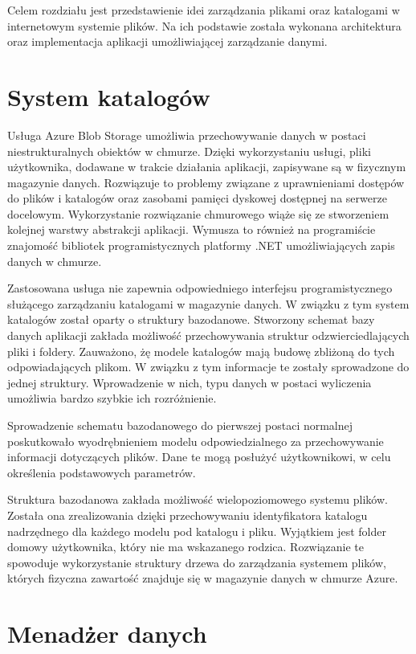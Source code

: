Celem rozdziału jest przedstawienie idei zarządzania plikami oraz katalogami w internetowym systemie plików. Na ich podstawie została wykonana architektura oraz implementacja aplikacji umożliwiającej zarządzanie danymi. 
\section{System katalogów}
Usługa Azure Blob Storage umożliwia przechowywanie danych w postaci niestrukturalnych obiektów w chmurze. Dzięki wykorzystaniu usługi, pliki użytkownika, dodawane w trakcie działania aplikacji, zapisywane są w fizycznym magazynie danych. Rozwiązuje to problemy związane z uprawnieniami dostępów do plików i katalogów oraz zasobami pamięci dyskowej dostępnej na serwerze docelowym. Wykorzystanie rozwiązanie chmurowego wiąże się ze stworzeniem kolejnej warstwy abstrakcji aplikacji. Wymusza to również na programiście znajomość bibliotek programistycznych platformy .NET umożliwiających zapis danych w chmurze. 

Zastosowana usługa nie zapewnia odpowiedniego interfejsu programistycznego służącego zarządzaniu katalogami w magazynie danych. W związku z tym system katalogów został oparty o struktury bazodanowe. Stworzony schemat bazy danych aplikacji zakłada możliwość przechowywania struktur odzwierciedlających pliki i foldery. Zauważono, żę modele katalogów mają budowę zbliżoną do tych odpowiadających plikom. W związku z tym informacje te zostały sprowadzone do jednej struktury. Wprowadzenie w nich, typu danych w postaci wyliczenia umożliwia bardzo szybkie ich rozróżnienie. 

Sprowadzenie schematu bazodanowego do pierwszej postaci normalnej poskutkowało wyodrębnieniem modelu odpowiedzialnego za przechowywanie informacji dotyczących plików. Dane te mogą posłużyć użytkownikowi, w celu określenia podstawowych parametrów. 

Struktura bazodanowa zakłada możliwość wielopoziomowego systemu plików. Została ona zrealizowania dzięki przechowywaniu identyfikatora katalogu nadrzędnego dla każdego modelu pod katalogu i pliku. Wyjątkiem jest folder domowy użytkownika, który nie ma wskazanego rodzica. Rozwiązanie te spowoduje wykorzystanie struktury drzewa do zarządzania systemem plików, których fizyczna zawartość znajduje się w magazynie danych w chmurze Azure. 

\section{Menadżer danych}

